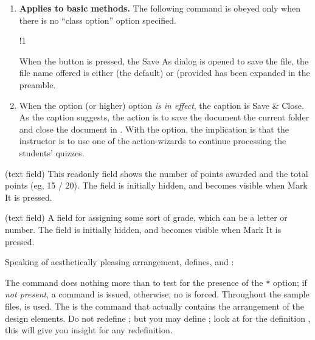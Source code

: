 \documentclass{article}
\begin{document}
\begin{description}
\begin{enumerate}
        \item[] \textbf{Applies to basic methods.} The following command is
        obeyed only when there is no ``class option'' option specified.
\bVerb\takeMeasure{\string\useNameToCustomize}%
\setlength{\eflength}{\bxSize}%
\def\1{\rlap{\hskip\eflength\sffamily{\enspace Obeyed for basic methods only}}}%
\begin{dCmd}[commandchars=!()]{\bxSize}
!1\useNameToCustomize
\end{dCmd}
\eVerb When the  button is pressed, the \textsf{Save As}
        dialog is opened to save the file, the file name offered is
        either  (the default) or
         (provided
         has been expanded in the preamble.
    \item When the  option (or higher) option \emph{is in
        effect}, the caption is \textsf{Save \& Close}. As the caption
        suggests, the action is to save the document the current folder
        and close the document in . With the 
        option, the implication is that the instructor is to use one of
        the action-wizards to continue processing the students' quizzes.
    \end{enumerate}
\item[\cs{studentReport}] (text field) This readonly field shows the number
    of points awarded and the total points (eg, 15 / 20). The field is initially hidden,
    and becomes visible when \textsf{Mark It} is pressed.
\item[\cs{studentGrade}] (text field) A field for assigning some sort of
    grade, which can be a letter or number. The field is initially hidden,
    and becomes visible when \textsf{Mark It} is pressed.
\end{description}
Speaking of aesthetically pleasing arrangement,  defines,
 and :
\bVerb\takeMeasure{\string\thQuizHeaderLayout}%
\begin{dCmd}[commandchars=!()]{\bxSize}
\thQuizHeader*
\thQuizHeaderLayout
\end{dCmd}
\eVerb The  command does nothing more than to test for the presence of
the \texttt{*} option; if \emph{not present}, a  command is
issued, otherwise, no  is forced. Throughout the sample files,
 is used. The  is the command that
actually contains the arrangement of the design elements. Do not redefine
; but you may define ; look at
 for the definition , this will
give you  insight for any redefinition.
\end{document}
